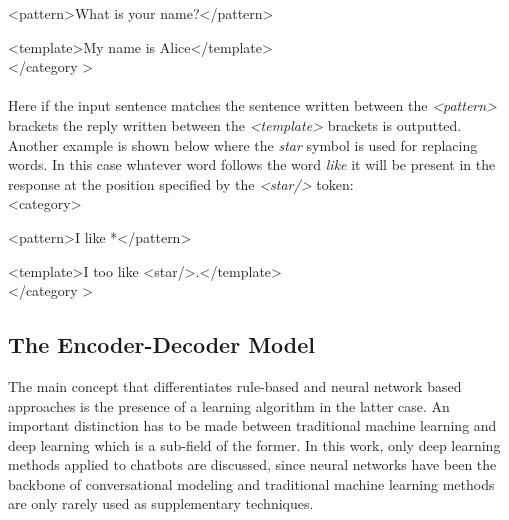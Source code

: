 \documentclass[12pt]{article}
\begin{document}
{\color{OliveGreen}\textless pattern\textgreater}What is your name?{\color{OliveGreen}\textless/pattern\textgreater}

{\color{OliveGreen}\textless template\textgreater}My name is Alice{\color{OliveGreen}\textless/template\textgreater}\\
{\color{OliveGreen}\textless/category \textgreater}\\
\\
Here if the input sentence matches the sentence written between the \textit{\textless pattern\textgreater} brackets the reply written between the \textit{\textless template\textgreater} brackets is outputted.\\
Another example is shown below where the \textit{star} symbol is used for replacing words. In this case whatever word follows the word \textit{like} it will be present in the response at the position specified by the \textit{\textless star/\textgreater} token:\\
{\color{OliveGreen}\textless category\textgreater}

{\color{OliveGreen}\textless pattern\textgreater}I like *{\color{OliveGreen}\textless/pattern\textgreater}

{\color{OliveGreen}\textless template\textgreater}I too like {\color{OliveGreen}\textless star/\textgreater}.{\color{OliveGreen}\textless/template\textgreater}\\
{\color{OliveGreen}\textless/category \textgreater}\\

\subsection{The Encoder-Decoder Model} \label{ssec:23}
The main concept that differentiates rule-based and neural network based approaches is the presence of a learning algorithm in the latter case. An important distinction has to be made between traditional machine learning and deep learning which is a sub-field of the former. In this work, only deep learning methods applied to chatbots are discussed, since neural networks have been the backbone of conversational modeling and traditional machine learning methods are only rarely used as supplementary techniques.   
\end{document}
